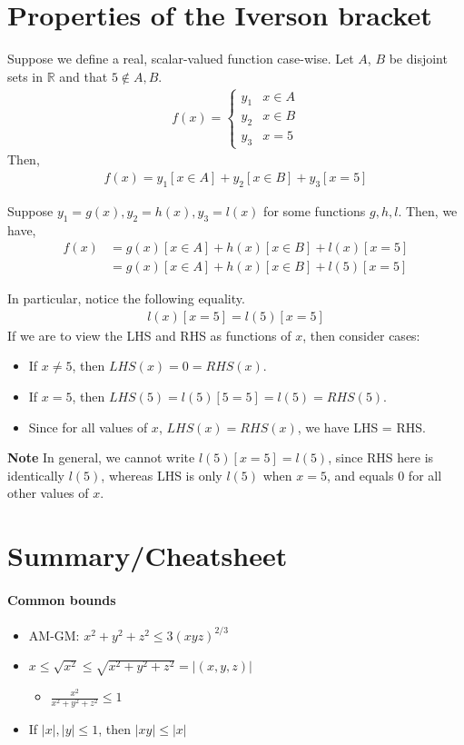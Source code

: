\documentclass{article}
\begin{document}
\section{Properties of the Iverson bracket}
Suppose we define a real, scalar-valued function case-wise. Let $A$, $B$ be disjoint sets in $\mathbb{R}$ and that $5\not \in A, B$.
\begin{align*}
	f(x)=
	\begin{cases}
		y_1 &x\in A\\
		y_2 &x\in B\\
		y_3 &x=5
	\end{cases}
\end{align*}
Then, 
\begin{align*}
	f(x) = y_1[x\in A] + y_2[x\in B] + y_3[x=5]
\end{align*}

Suppose $y_1 = g(x), y_2 = h(x), y_3=l(x)$ for some functions $g,h,l$. Then, we have,
\begin{align*}
	f(x) &= g(x)[x\in A] + h(x)[x\in B] + l(x)[x=5]\\
	&= g(x)[x\in A] + h(x)[x\in B] + l(5)[x=5]
\end{align*}

In particular, notice the following equality.
\begin{align*}
	l(x)[x=5] = l(5)[x=5]
\end{align*}
If we are to view the LHS and RHS as functions of $x$, then consider cases:
\begin{itemize}
	\item If $x\neq 5$, then $LHS(x) = 0 = RHS(x)$.
	\item If $x=5$, then $LHS(5)=l(5)[5=5] = l(5) = RHS(5)$.
	\item Since for all values of $x$, $LHS(x)=RHS(x)$, we have LHS = RHS.
\end{itemize}

\textbf{Note} In general, we cannot write $l(5)[x=5] = l(5)$, since RHS here is identically $l(5)$, whereas LHS is only $l(5)$ when $x=5$, and equals $0$ for all other values of $x$.

\section{Summary/Cheatsheet}
\paragraph{Common bounds}
\begin{itemize}
	\item AM-GM: $x^2+y^2+z^2\leq 3(xyz)^{2/3}$
	\item $x\leq \sqrt{x^2} \leq  \sqrt{x^2+y^2+z^2} = |(x,y,z)|$
	\begin{itemize}
		\item $\frac{x^2}{x^2+y^2+z^2}\leq 1$
	\end{itemize}
	\item If $|x|,|y|\leq 1$, then $|xy|\leq |x|$
\end{itemize}
\end{document}
